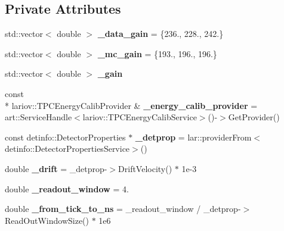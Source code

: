 \subsection*{Private Attributes}
\begin{DoxyCompactItemize}
\item 
\hypertarget{group__lee_gab80c71d066234aa8f0b483c34a068d55}{std\-::vector$<$ double $>$ {\bfseries \-\_\-data\-\_\-gain} = \{236., 228., 242.\}}\label{group__lee_gab80c71d066234aa8f0b483c34a068d55}

\item 
\hypertarget{group__lee_ga5c5abe13d6a7820e1658a802790f7e80}{std\-::vector$<$ double $>$ {\bfseries \-\_\-mc\-\_\-gain} = \{193., 196., 196.\}}\label{group__lee_ga5c5abe13d6a7820e1658a802790f7e80}

\item 
\hypertarget{group__lee_ga9f16c348e247cda52785e968cfad1b91}{std\-::vector$<$ double $>$ {\bfseries \-\_\-gain}}\label{group__lee_ga9f16c348e247cda52785e968cfad1b91}

\item 
\hypertarget{group__lee_ga4cc0815f3fccf5f704c44fc0a5ed0717}{const \\*
lariov\-::\-T\-P\-C\-Energy\-Calib\-Provider \& {\bfseries \-\_\-energy\-\_\-calib\-\_\-provider} = art\-::\-Service\-Handle$<$lariov\-::\-T\-P\-C\-Energy\-Calib\-Service$>$()-\/$>$Get\-Provider()}\label{group__lee_ga4cc0815f3fccf5f704c44fc0a5ed0717}

\item 
\hypertarget{group__lee_ga5dc96ef9f0d974147c51ca27e46351fa}{const detinfo\-::\-Detector\-Properties $\ast$ {\bfseries \-\_\-detprop} = lar\-::provider\-From$<$detinfo\-::\-Detector\-Properties\-Service$>$()}\label{group__lee_ga5dc96ef9f0d974147c51ca27e46351fa}

\item 
\hypertarget{group__lee_ga5ee65f3a1c672b4f089c05ba6b4ab132}{double {\bfseries \-\_\-drift} = \-\_\-detprop-\/$>$Drift\-Velocity() $\ast$ 1e-\/3}\label{group__lee_ga5ee65f3a1c672b4f089c05ba6b4ab132}

\item 
\hypertarget{group__lee_gad704feff08cf9f09aa46f306e126bbbb}{double {\bfseries \-\_\-readout\-\_\-window} = 4.}\label{group__lee_gad704feff08cf9f09aa46f306e126bbbb}

\item 
\hypertarget{group__lee_ga12d5d0f2b40a3971d57e37b1d176e45d}{double {\bfseries \-\_\-from\-\_\-tick\-\_\-to\-\_\-ns} = \-\_\-readout\-\_\-window / \-\_\-detprop-\/$>$Read\-Out\-Window\-Size() $\ast$ 1e6}\label{group__lee_ga12d5d0f2b40a3971d57e37b1d176e45d}


\end{DoxyCompactItemize}
